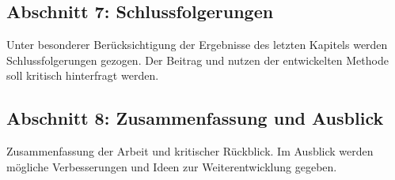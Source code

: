 		\subsection*{Abschnitt 7: Schlussfolgerungen}
			Unter besonderer Berücksichtigung der Ergebnisse des letzten Kapitels werden Schlussfolgerungen gezogen. 
			Der Beitrag und nutzen der entwickelten Methode soll kritisch hinterfragt werden.

		\subsection*{Abschnitt 8: Zusammenfassung und Ausblick}
			Zusammenfassung der Arbeit und kritischer Rückblick. Im Ausblick werden mögliche Verbesserungen und Ideen zur Weiterentwicklung gegeben.  